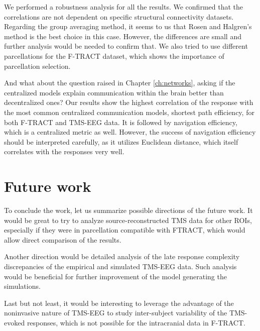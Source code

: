 We performed a robustness analysis for all the results. We confirmed that the correlations are not dependent on specific structural connectivity datasets. Regarding the group averaging method, it seems to us that Rosen and Halgren's method is the best choice in this case. However, the differences are small and further analysis would be needed to confirm that. We also tried to use different parcellations for the F-TRACT dataset, which shows the importance of parcellation selection.

And what about the question raised in Chapter \ref{ch:networks}, asking if the centralized models explain communication within the brain better than decentralized ones? Our results show the highest correlation of the response with the most common centralized communication models, shortest path efficiency, for both F-TRACT and TMS-EEG data. It is followed by navigation efficiency, which is a centralized metric as well. However, the success of navigation efficiency should be interpreted carefully, as it utilizes Euclidean distance, which itself correlates with the responses very well.

\section*{Future work}

To conclude the work, let us summarize possible directions of the future work. It would be great to try to analyze source-reconstructed TMS data for other ROIs, especially if they were in parcellation compatible with FTRACT, which would allow direct comparison of the results.

Another direction would be detailed analysis of the late response complexity discrepancies of the empirical and simulated TMS-EEG data. Such analysis would be beneficial for further improvement of the model generating the simulations.

Last but not least, it would be interesting to leverage the advantage of the noninvasive nature of TMS-EEG to study inter-subject variability of the TMS-evoked responses, which is not possible for the intracranial data in F-TRACT.